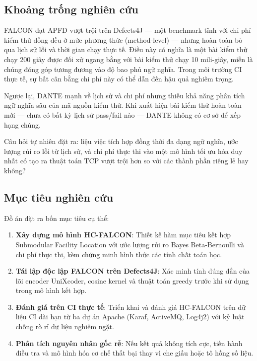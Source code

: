 \subsection{Khoảng trống nghiên cứu}
\label{subsec:research_gap}

FALCON đạt APFD vượt trội trên Defects4J --- một benchmark tĩnh với chi phí kiểm thử đồng đều ở mức phương thức (method-level) --- nhưng hoàn toàn bỏ qua lịch sử lỗi và thời gian chạy thực tế. Điều này có nghĩa là một bài kiểm thử chạy 200 giây được đối xử ngang bằng với bài kiểm thử chạy 10 mili-giây, miễn là chúng đóng góp tương đương vào độ bao phủ ngữ nghĩa. Trong môi trường CI thực tế, sự bất cân bằng chi phí này có thể dẫn đến hậu quả nghiêm trọng.

Ngược lại, DANTE mạnh về lịch sử và chi phí nhưng thiếu khả năng phân tích ngữ nghĩa sâu của mã nguồn kiểm thử. Khi xuất hiện bài kiểm thử hoàn toàn mới --- chưa có bất kỳ lịch sử pass/fail nào --- DANTE không có cơ sở để xếp hạng chúng.

Câu hỏi tự nhiên đặt ra: liệu việc tích hợp đồng thời đa dạng ngữ nghĩa, ước lượng rủi ro lỗi từ lịch sử, và chi phí thực thi vào một mô hình tối ưu hóa duy nhất có tạo ra thuật toán TCP vượt trội hơn so với các thành phần riêng lẻ hay không?

\subsection{Mục tiêu nghiên cứu}
\label{subsec:objectives}

Đồ án đặt ra bốn mục tiêu cụ thể:

\begin{enumerate}
    \item \textbf{Xây dựng mô hình HC-FALCON}: Thiết kế hàm mục tiêu kết hợp Submodular Facility Location với ước lượng rủi ro Bayes Beta-Bernoulli và chi phí thực thi, kèm chứng minh hình thức các tính chất toán học.
    \item \textbf{Tái lập độc lập FALCON trên Defects4J}: Xác minh tính đúng đắn của lõi encoder UniXcoder, cosine kernel và thuật toán greedy trước khi sử dụng trong mô hình kết hợp.
    \item \textbf{Đánh giá trên CI thực tế}: Triển khai và đánh giá HC-FALCON trên dữ liệu CI dài hạn từ ba dự án Apache (Karaf, ActiveMQ, Log4j2) với kỷ luật chống rò rỉ dữ liệu nghiêm ngặt.
    \item \textbf{Phân tích nguyên nhân gốc rễ}: Nếu kết quả không tích cực, tiến hành điều tra và mô hình hóa cơ chế thất bại thay vì che giấu hoặc tô hồng số liệu.
\end{enumerate}

